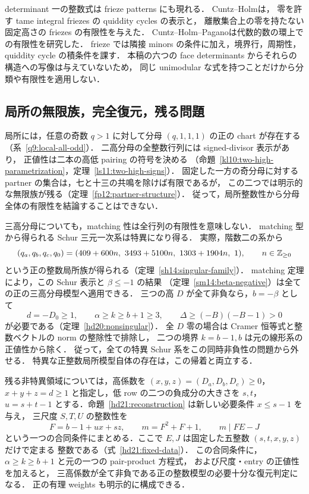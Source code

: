 determinant 一の整数式は frieze patterns にも現れる．
Cuntz--Holm\cite[\S\S2--3 and~7]{CuntzHolmFriezes}は，
零を許す tame integral friezes の quiddity cycles の表示と，
離散集合上の零を持たない固定高さの friezes の有限性を与えた．
Cuntz--Holm--Pagano\cite{CuntzHolmPagano}は代数的数の環上での有限性を研究した．
frieze では隣接 minors の条件に加え，境界行，周期性，quiddity cycle の積条件を課す．
本稿の六つの face determinants からそれらの構造への写像は与えていないため，
同じ unimodular な式を持つことだけから分類や有限性を適用しない．

\subsection{局所の無限族，完全復元，残る問題}

局所には，任意の奇数 $q>1$ に対して分母 $(q,1,1,1)$ の正の chart が存在する
（系~\ref{q9:local-all-odd}）．
二高分母の全整数行列には signed-divisor 表示があり，
正値性は二本の高低 pairing の符号を決める
（命題~\ref{kl10:two-high-parametrization}，定理~\ref{ls11:two-high-signs}）．
固定した一方の奇分母に対する partner の集合は，七と十三の共鳴を除けば有限であるが，
この二つでは明示的な無限族が残る（定理~\ref{fp12:partner-structure}）．
従って，局所整数性から分母全体の有限性を結論することはできない．

三高分母についても，matching 性は全行列の有限性を意味しない．
matching 型から得られる Schur 三元一次系は特異になり得る．
実際，階数二の系から
\[
 (q_a,q_b,q_c,q_0)
 =(409+600n,\ 3493+5100n,\ 1303+1904n,\ 1),
 \qquad n\in\mathbb Z_{\ge0}
\]
という正の整数局所族が得られる（定理~\ref{sh14:singular-family}）．
matching 定理により，この Schur 表示と $\beta\le-1$ の結果
（定理~\ref{sm14:beta-negative}）は全ての正の三高分母模型へ適用できる．
三つの高 $D$ が全て非負なら，$b=-\beta$ として
\[
 d=-D_0\ge1,\qquad \alpha\ge k\ge b+1\ge3,
 \qquad \Delta\ge(-B)(-B-1)>0
\]
が必要である（定理~\ref{hd20:nonsingular}）．
全 $D$ 零の場合は Cramer 恒等式と整数ベクトルの norm の整除性で排除し，
二つの境界 $k=b-1,b$ は元の線形系の正値性から除く．
従って，全ての特異 Schur 系をこの同時非負性の問題から外せる．
特異な正整数局所模型自体の存在は，この帰着と両立する．

残る非特異領域については，高係数を
$(x,y,z)=(D_a,D_b,D_c)\ge0$，$x+y+z=d\ge1$ と指定し，低 row の二つの負成分の大きさを $s,t$，
$u=s+t-1$ とする．命題~\ref{hd21:reconstruction} は新しい必要条件 $x\le s-1$ を与え，
三尺度 $S,T,U$ の整数性を
\[
 F=b-1+ux+sz,\qquad m=F^2+F+1,\qquad m\mid FE-J
\]
という一つの合同条件にまとめる．ここで $E,J$ は固定した五整数 $(s,t,x,y,z)$ だけで定まる
整数である（式~\eqref{hd21:fixed-data}）．
この合同条件に，$\alpha\ge k\ge b+1$ と元の一つの pair-product 方程式，
および尺度・entry の正値性を加えると，
三高係数が全て非負である正の整数模型の必要十分な復元判定になる．
正の有理 weights も明示的に構成できる．

